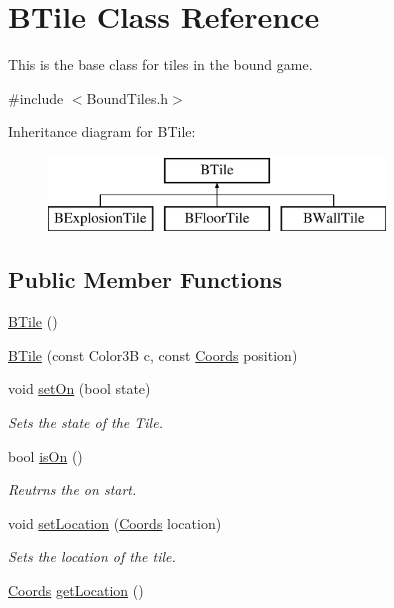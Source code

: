 \hypertarget{class_b_tile}{\section{\-B\-Tile \-Class \-Reference}
\label{class_b_tile}
}


\-This is the base class for tiles in the bound game.  




{\ttfamily \#include $<$\-Bound\-Tiles.\-h$>$}

\-Inheritance diagram for \-B\-Tile\-:\begin{figure}[H]
\begin{center}
\leavevmode
\includegraphics[height=2.000000cm]{class_b_tile}
\end{center}
\end{figure}
\subsection*{\-Public \-Member \-Functions}
\begin{DoxyCompactItemize}
\item 
\hyperlink{class_b_tile_a7646b89b701a776494e16405b9d90871}{\-B\-Tile} ()
\item 
\hyperlink{class_b_tile_aac430c52b468db1167d715cc867e617e}{\-B\-Tile} (const \-Color3\-B c, const \hyperlink{struct_coords}{\-Coords} position)
\item 
void \hyperlink{class_b_tile_a0eccbc17368dbc03efea70fd9ca5af20}{set\-On} (bool state)
\begin{DoxyCompactList}\small\item\em \-Sets the state of the \-Tile. \end{DoxyCompactList}\item 
bool \hyperlink{class_b_tile_ab59bb83ecf56ec30d95c98ab3090d532}{is\-On} ()
\begin{DoxyCompactList}\small\item\em \-Reutrns the on start. \end{DoxyCompactList}\item 
void \hyperlink{class_b_tile_a64dfa0b2841ab4fc5a1e465f1389cb10}{set\-Location} (\hyperlink{struct_coords}{\-Coords} location)
\begin{DoxyCompactList}\small\item\em \-Sets the location of the tile. \end{DoxyCompactList}\item 
\hyperlink{struct_coords}{\-Coords} \hyperlink{class_b_tile_af0e20c14792be231f3b490eb1ec10a73}{get\-Location} ()
\end{DoxyCompactItemize}

